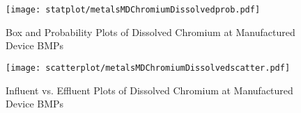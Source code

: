         \begin{figure}[hb]   %
            \centering
            \texttt{[image: statplot/metalsMDChromiumDissolvedprob.pdf]}
            \caption{Box and Probability Plots of Dissolved Chromium at Manufactured Device BMPs}
        \end{figure}         %
        
        
        \begin{figure}[hb]   %
            \centering
            \texttt{[image: scatterplot/metalsMDChromiumDissolvedscatter.pdf]}
            \caption{Influent vs. Effluent Plots of Dissolved Chromium at Manufactured Device BMPs}
        \end{figure}         %
        \clearpage
        